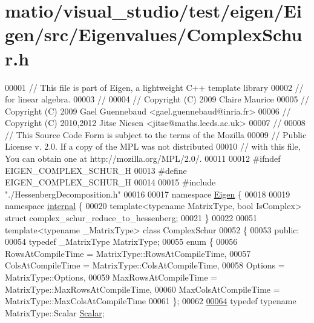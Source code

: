 \hypertarget{matio_2visual__studio_2test_2eigen_2_eigen_2src_2_eigenvalues_2_complex_schur_8h_source}{}\section{matio/visual\+\_\+studio/test/eigen/\+Eigen/src/\+Eigenvalues/\+Complex\+Schur.h}
\label{matio_2visual__studio_2test_2eigen_2_eigen_2src_2_eigenvalues_2_complex_schur_8h_source}

\begin{DoxyCode}
00001 \textcolor{comment}{// This file is part of Eigen, a lightweight C++ template library}
00002 \textcolor{comment}{// for linear algebra.}
00003 \textcolor{comment}{//}
00004 \textcolor{comment}{// Copyright (C) 2009 Claire Maurice}
00005 \textcolor{comment}{// Copyright (C) 2009 Gael Guennebaud <gael.guennebaud@inria.fr>}
00006 \textcolor{comment}{// Copyright (C) 2010,2012 Jitse Niesen <jitse@maths.leeds.ac.uk>}
00007 \textcolor{comment}{//}
00008 \textcolor{comment}{// This Source Code Form is subject to the terms of the Mozilla}
00009 \textcolor{comment}{// Public License v. 2.0. If a copy of the MPL was not distributed}
00010 \textcolor{comment}{// with this file, You can obtain one at http://mozilla.org/MPL/2.0/.}
00011 
00012 \textcolor{preprocessor}{#ifndef EIGEN\_COMPLEX\_SCHUR\_H}
00013 \textcolor{preprocessor}{#define EIGEN\_COMPLEX\_SCHUR\_H}
00014 
00015 \textcolor{preprocessor}{#include "./HessenbergDecomposition.h"}
00016 
00017 \textcolor{keyword}{namespace }\hyperlink{namespace_eigen}{Eigen} \{ 
00018 
00019 \textcolor{keyword}{namespace }\hyperlink{namespaceinternal}{internal} \{
00020 \textcolor{keyword}{template}<\textcolor{keyword}{typename} MatrixType, \textcolor{keywordtype}{bool} IsComplex> \textcolor{keyword}{struct }complex\_schur\_reduce\_to\_hessenberg;
00021 \}
00022 
00051 \textcolor{keyword}{template}<\textcolor{keyword}{typename} \_MatrixType> \textcolor{keyword}{class }ComplexSchur
00052 \{
00053   \textcolor{keyword}{public}:
00054     \textcolor{keyword}{typedef} \_MatrixType MatrixType;
00055     \textcolor{keyword}{enum} \{
00056       RowsAtCompileTime = MatrixType::RowsAtCompileTime,
00057       ColsAtCompileTime = MatrixType::ColsAtCompileTime,
00058       Options = MatrixType::Options,
00059       MaxRowsAtCompileTime = MatrixType::MaxRowsAtCompileTime,
00060       MaxColsAtCompileTime = MatrixType::MaxColsAtCompileTime
00061     \};
00062 
\hyperlink{group___eigenvalues___module_a9a8ee9df37ee1f90d0e53103c58683c0}{00064}     \textcolor{keyword}{typedef} \textcolor{keyword}{typename} MatrixType::Scalar \hyperlink{group___eigenvalues___module_a9a8ee9df37ee1f90d0e53103c58683c0}{Scalar};

\end{DoxyCode}

